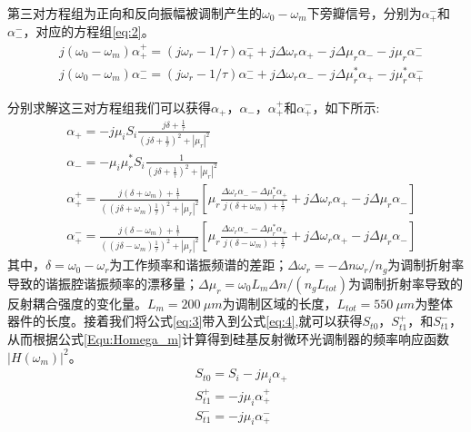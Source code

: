 第三对方程组为正向和反向振幅被调制产生的$\omega_0-\omega_m$下旁瓣信号，分别为$\alpha_+^-$和$\alpha_-^-$，对应的方程组\ref{eq:2}。
\begin{subequations}  \label{eq:2}
	\begin{align}  
	&j(\omega_0-\omega_m)\alpha_+^+ = (j\omega_r-1/\tau)\alpha_+^- +j\Delta \omega_r\alpha_+ - j\Delta \mu_r\alpha_- - j\mu_r\alpha_-^-            \label{eq:2A} \\
	&j(\omega_0-\omega_m)\alpha_-^- = (j\omega_r-1/\tau)\alpha_-^- +j\Delta \omega_r\alpha_- - j\Delta \mu_r^*\alpha_+ - j\mu_r^*\alpha_+^-           \label{eq:2B}
	\end{align}
\end{subequations}

分别求解这三对方程组我们可以获得$\alpha_+$，$\alpha_-$，$\alpha_+^+$和$\alpha_+^-$，如下所示:
\begin{subequations}  \label{eq:3}
	\begin{align}  
	&\alpha_+ = -j\mu_iS_i \frac{j\delta+\frac{1}{\tau}}{(j\delta+\frac{1}{\tau})^2+|\mu_r|^2}  	\label{eq:3A}\\
	&\alpha_- = -\mu_i\mu_r^*S_i \frac{1}{(j\delta+\frac{1}{\tau})^2+|\mu_r|^2}  	\label{eq:3B}\\	
	&\alpha_+^+ = \frac{j(\delta+\omega_m)+\frac{1}{\tau}}{((j\delta+\omega_m)\frac{1}{\tau})^2+|\mu_r|^2}\left[\mu_r\frac{\Delta \omega_r\alpha_- - \Delta\mu_r^*\alpha_+}{j(\delta+\omega_m)+\frac{1}{\tau}} + j\Delta \omega_r \alpha_+ -j\Delta\mu_r\alpha_-\right]             \label{eq:3C}\\
	&\alpha_+^- = \frac{j(\delta-\omega_m)+\frac{1}{\tau}}{((j\delta-\omega_m)\frac{1}{\tau})^2+|\mu_r|^2}\left[\mu_r\frac{\Delta \omega_r\alpha_- - \Delta\mu_r^*\alpha_+}{j(\delta-\omega_m)+\frac{1}{\tau}} + j\Delta \omega_r \alpha_+ -j\Delta\mu_r\alpha_-\right]             \label{eq:3D}	
	\end{align}
\end{subequations}
其中，$\delta = \omega_0-\omega_r$为工作频率和谐振频谱的差距；$\Delta \omega_r = -\Delta n \omega_r /n_g$为调制折射率导致的谐振腔谐振频率的漂移量；$\Delta \mu_r = \omega_0 L_m \Delta n/(n_g L_{tot})$为调制折射率导致的反射耦合强度的变化量。$L_m = 200~\mu m$为调制区域的长度，$L_{tot} = 550~\mu m$为整体器件的长度。接着我们将公式\ref{eq:3}带入到公式\ref{eq:4},就可以获得$S_{t0}$，$S_{t1}^+$，和$S_{t1}^-$，从而根据公式\ref{Equ:Homega_m}计算得到硅基反射微环光调制器的频率响应函数$|H(\omega_m)|^2$。
\begin{subequations}  \label{eq:4}
	\begin{align}  
	&S_{t0} = S_i-j\mu_i\alpha_+  	\label{eq:4A}\\
	&S_{t1}^+ = -j\mu_i\alpha_+^+ 	\label{eq:4B}\\	
	&S_{t1}^- = -j\mu_i\alpha_+^-            \label{eq:4C}	
	\end{align}
\end{subequations}

